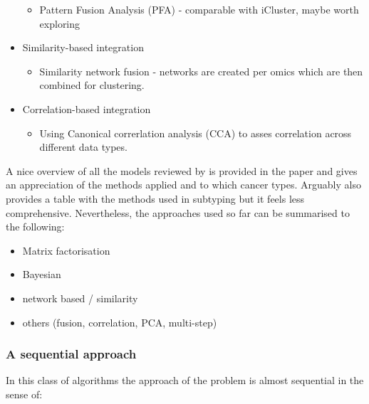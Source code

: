 \begin{itemize}
        \begin{itemize}
            \item Pattern Fusion Analysis (PFA) - comparable with iCluster, maybe worth exploring
        \end{itemize}
    \item Similarity-based integration
        \begin{itemize}
            \item Similarity network fusion - networks are created per omics which are then combined for clustering.
        \end{itemize}
    \item Correlation-based integration
        \begin{itemize}
            \item Using Canonical correrlation analysis (CCA) to asses correlation across different data types.
        \end{itemize}
\end{itemize}

A nice overview of all the models reviewed by \citet{Menyhart2021-ef} is provided in the paper and gives an appreciation of the methods applied and to which cancer types. Arguably \citet{Subramanian2020-tk} also provides a table with the methods used in subtyping but it feels less comprehensive. Nevertheless, the approaches used so far can be summarised to the following:
\begin{itemize}
    \item Matrix factorisation
    \item Bayesian
    \item network based / similarity 
    \item others (fusion, correlation, PCA, multi-step)
\end{itemize}

\subsubsection{A sequential approach}

In this class of algorithms the approach of the problem is almost sequential in the sense of:

